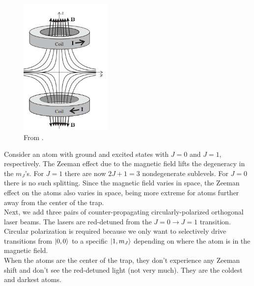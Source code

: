 \documentclass{book}
\theoremstyle{definition}
\begin{document}
\begin{figure}[!htb]
	\centering
	\includegraphics[width=0.4\textwidth]{images/anti-helmholtz}
	\caption{From \cite{foot2005atomic}.}
\end{figure}

Consider an atom with ground and excited states with $J=0$ and $J=1$, respectively. The Zeeman effect due to the magnetic field lifts the degeneracy in the $m_J$'s. For $J=1$ there are now $2J+1 = 3$ nondegenerate sublevels. For $J=0$ there is no such splitting. Since the magnetic field varies in space, the Zeeman effect on the atoms also varies in space, being more extreme for atoms further away from the center of the trap. \\


Next, we add three pairs of counter-propagating circularly-polarized orthogonal laser beams. The lasers are red-detuned from the $J=0 \to J=1$ transition. Circular polarization is required because we only want to selectively drive transitions from $\ket{0,0}$ to a specific $\ket{1,m_J}$ depending on where the atom is in the magnetic field. \\


When the atoms are the center of the trap, they don't experience any Zeeman shift and don't see the red-detuned light (not very much). They are the coldest and darkest atoms.\\
\end{document}
